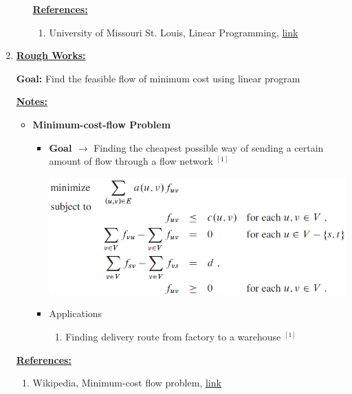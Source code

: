 \documentclass[12pt]{article}
\begin{document}
\begin{enumerate}[1.]
\begin{itemize}
        \underline{\textbf{References:}}

        \bigskip

        \begin{enumerate}[1)]
            \item University of Missouri St. Louis, Linear Programming, \href{http://umsl.edu/~adhikarib/cs4130-fall2017/slides/10%20-%20Linear%20Programming.pdf}{link}
        \end{enumerate}
    \end{itemize}

    \item

    \bigskip

    \underline{\textbf{Rough Works:}}

    \bigskip

    \textbf{Goal:} Find the feasible flow of minimum cost using linear program

    \bigskip

    \underline{\textbf{Notes:}}

    \bigskip

    \begin{itemize}
        \item \textbf{Minimum-cost-flow Problem}

        \begin{itemize}
            \item \textbf{Goal $\to$} Finding the cheapest possible way of sending a
            certain amount of flow through a flow network $^{[1]}$

            \begin{center}
            \includegraphics[width=0.8\linewidth]{images/worksheet_6_solution_19.png}
            \end{center}

            \item Applications

            \begin{enumerate}[1)]
                \item Finding delivery route from factory to a warehouse $^{[1]}$
            \end{enumerate}
        \end{itemize}
    \end{itemize}

    \bigskip

    \underline{\textbf{References:}}

    \begin{enumerate}[1)]
        \item Wikipedia, Minimum-cost flow problem, \href{https://en.wikipedia.org/wiki/Minimum-cost_flow_problem}{link}
    \end{enumerate}

\end{enumerate}
\end{document}
